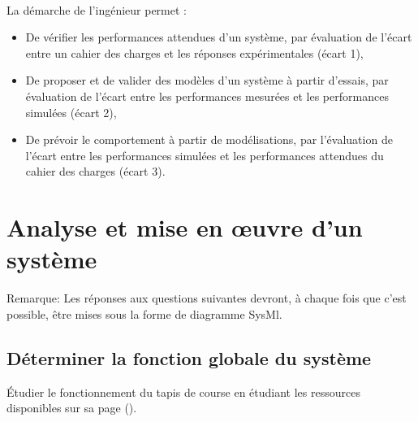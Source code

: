 

 \\

\graphicspath{{../../../img/}}
\begin{center}
\def\svgwidth{\columnwidth}

\end{center}

La démarche de l’ingénieur permet :
\begin{itemize}
 \item De vérifier les performances attendues d’un système, par évaluation de l’écart entre un cahier des charges et les réponses expérimentales (écart 1),
 \item De proposer et de valider des modèles d’un système à partir d’essais, par évaluation de l’écart entre les performances mesurées et les performances simulées (écart 2),
 \item De prévoir le comportement à partir de modélisations, par l’évaluation de l’écart entre les performances simulées et les performances attendues du cahier des charges (écart 3).
\end{itemize}


\newpage

\section{Analyse et mise en \oe uvre d'un système} 

Remarque: Les réponses aux questions suivantes devront, à chaque fois que c'est possible, être mises sous la forme de diagramme SysMl.

\subsection{Déterminer la fonction globale du système} 

Étudier le fonctionnement du tapis de course en étudiant les ressources disponibles sur sa page (\urlsysteme).


